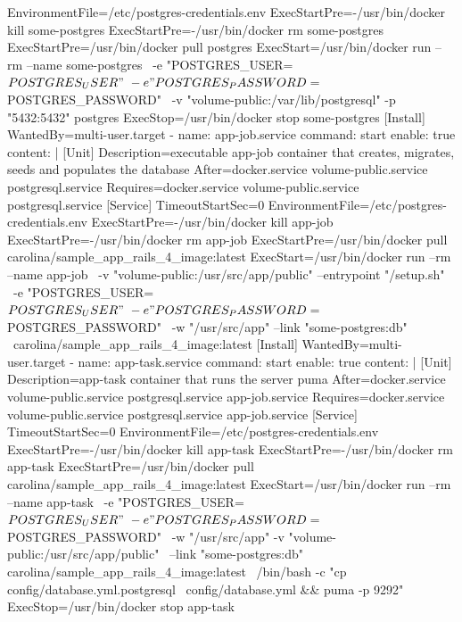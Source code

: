 \begin{codelisting}
\begin{code}
      EnvironmentFile=/etc/postgres-credentials.env
      ExecStartPre=-/usr/bin/docker kill some-postgres 
      ExecStartPre=-/usr/bin/docker rm some-postgres 
      ExecStartPre=/usr/bin/docker pull postgres 
      ExecStart=/usr/bin/docker run --rm --name some-postgres \
      -e "POSTGRES_USER=${POSTGRES_USER}" \
      -e "POSTGRES_PASSWORD=${POSTGRES_PASSWORD}" \
      -v "volume-public:/var/lib/postgresql" -p "5432:5432" postgres 
      ExecStop=/usr/bin/docker stop some-postgres
      [Install] 
      WantedBy=multi-user.target
  - name: app-job.service
    command: start
    enable: true
    content: |
      [Unit] 
      Description=executable app-job container that creates, migrates, seeds
                  and populates the database
      After=docker.service volume-public.service postgresql.service
      Requires=docker.service volume-public.service postgresql.service
      [Service] 
      TimeoutStartSec=0 
      EnvironmentFile=/etc/postgres-credentials.env
      ExecStartPre=-/usr/bin/docker kill app-job 
      ExecStartPre=-/usr/bin/docker rm app-job 
      ExecStartPre=/usr/bin/docker pull carolina/sample_app_rails_4_image:latest 
      ExecStart=/usr/bin/docker run --rm --name app-job \
                -v "volume-public:/usr/src/app/public" --entrypoint "/setup.sh" \
      -e "POSTGRES_USER=${POSTGRES_USER}" \
      -e "POSTGRES_PASSWORD=${POSTGRES_PASSWORD}" \
      -w "/usr/src/app" --link "some-postgres:db" \
      carolina/sample_app_rails_4_image:latest
      [Install] 
      WantedBy=multi-user.target
  - name: app-task.service
    command: start
    enable: true
    content: |
      [Unit] 
      Description=app-task container that runs the server puma
      After=docker.service volume-public.service postgresql.service 
            app-job.service
      Requires=docker.service volume-public.service postgresql.service 
               app-job.service
      [Service] 
      TimeoutStartSec=0 
      EnvironmentFile=/etc/postgres-credentials.env
      ExecStartPre=-/usr/bin/docker kill app-task 
      ExecStartPre=-/usr/bin/docker rm app-task
      ExecStartPre=/usr/bin/docker pull carolina/sample_app_rails_4_image:latest 
      ExecStart=/usr/bin/docker run --rm --name app-task \
      -e "POSTGRES_USER=${POSTGRES_USER}" \
      -e "POSTGRES_PASSWORD=${POSTGRES_PASSWORD}" \
      -w "/usr/src/app" -v "volume-public:/usr/src/app/public" \
      --link "some-postgres:db" carolina/sample_app_rails_4_image:latest \
      /bin/bash -c "cp config/database.yml.postgresql \
      config/database.yml && puma -p 9292"
      ExecStop=/usr/bin/docker stop app-task

\end{code}
\end{codelisting}

